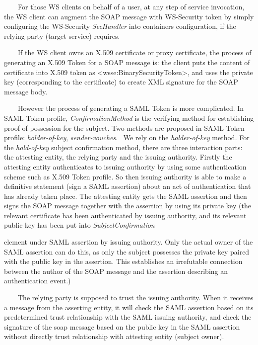 \documentclass{article}
\begin{document}
\ \ \ \ For those WS clients on behalf of a user, at any step of service
invocation, the WS client can augment the SOAP message with WS-Security
token by simply configuring the WS-Security \textit{SecHandler} into
container{\textquotesingle}s configuration, if the relying party
(target service) requires. 

\ \ \ \ If the WS client owns an X.509 certificate or proxy certificate,
the process of generating an X.509 Token for a SOAP message is: the
client puts the content of certificate into X.509 token as
{\textless}wsse:BinarySecurityToken{\textgreater}, and uses the private
key (corresponding to the certificate) to create XML signature for the
SOAP message body. 

\ \ \ \ However the process of generating a SAML Token is more
complicated. In SAML Token profile, \textit{ConfirmationMethod} is the
verifying method for establishing proof-of-possession for the subject.
Two methods are proposed in SAML Token profile: \textit{holder-of-key},
\textit{sender-vouches}. \ We rely on the \textit{holder-of-key
}method. For the \textit{hold-of-key} subject confirmation method,
there are three interaction parts: the attesting entity, the relying
party and the issuing authority. Firstly the attesting entity
authenticates to issuing authority by using some authentication scheme
such as X.509 Token profile. So then issuing authority is able to make
a definitive statement (sign a SAML assertion) about an act of
authentication that has already taken place. The attesting entity gets
the SAML assertion and then signs the SOAP message together with the
assertion by using its private key (the relevant certificate has been
authenticated by issuing authority, and its relevant public key has
been put into \textit{SubjectConfirmation} 

element under SAML assertion by issuing authority. Only the actual owner
of the SAML assertion can do this, as only the subject possesses the
private key paired with the public key in the assertion. This
establishes an irrefutable connection between the author of the SOAP
message and the assertion describing an authentication event.) 

\ \ \ \ The relying party is supposed to trust the issuing authority.
When it receives a message from the asserting entity, it will check the
SAML assertion based on its predetermined trust relationship with the
SAML issuing authority, and check the signature of the soap message
based on the public key in the SAML assertion without directly trust
relationship with attesting entity (subject owner). 
\end{document}

